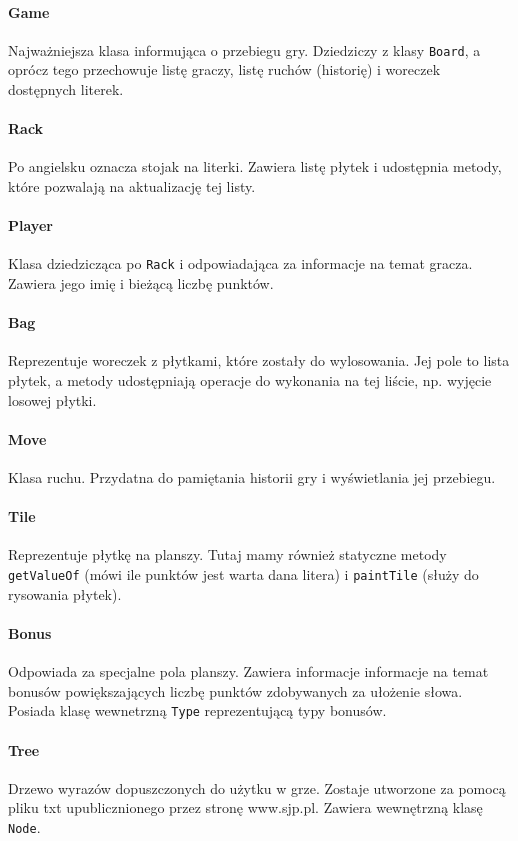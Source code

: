 \documentclass[a4paper]{article}
\begin{document}
\paragraph{Game} Najważniejsza klasa informująca o przebiegu gry. Dziedziczy z klasy \texttt{Board}, a oprócz tego przechowuje listę graczy, listę ruchów (historię) i woreczek dostępnych literek.
\paragraph{Rack} Po angielsku oznacza stojak na literki. Zawiera listę płytek i udostępnia metody, które pozwalają na aktualizację tej listy.
\paragraph{Player} Klasa dziedzicząca po \texttt{Rack} i odpowiadająca za informacje na temat gracza. Zawiera jego imię i bieżącą liczbę punktów.
\paragraph{Bag} Reprezentuje woreczek z płytkami, które zostały do wylosowania. Jej pole to lista płytek, a metody udostępniają operacje do wykonania na tej liście, np. wyjęcie losowej płytki.
\paragraph{Move} Klasa ruchu. Przydatna do pamiętania historii gry i wyświetlania jej przebiegu.
\paragraph{Tile} Reprezentuje płytkę na planszy. Tutaj mamy również statyczne metody \texttt{getValueOf} (mówi ile punktów jest warta dana litera) i \texttt{paintTile} (służy do rysowania płytek).
\paragraph{Bonus} Odpowiada za specjalne pola planszy. Zawiera informacje informacje na temat bonusów powiększających liczbę punktów zdobywanych za ułożenie słowa. Posiada klasę wewnetrzną \texttt{Type} reprezentującą typy bonusów.
\paragraph{Tree}
Drzewo wyrazów dopuszczonych do użytku w grze. Zostaje utworzone za pomocą pliku txt upublicznionego przez stronę www.sjp.pl. Zawiera wewnętrzną klasę \texttt{Node}. 
\end{document}
